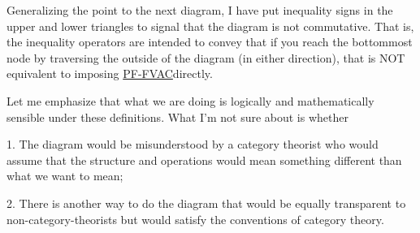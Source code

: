 \documentclass[\econtexRoot/BufferStockTheory]{subfiles}
\newcommand{\BSTlinkTo}{https://\owner.github.io/BufferStockTheory}
\renewcommand{\PFFVAC}{\href{{\BSTlinkTo}\#PFFVAC}{\textrm{PF-FVAC}}}
\begin{document}
\begin{CDCPrivate}
Generalizing the point to the next diagram, I have put inequality signs in the upper and lower triangles to signal that the diagram is not commutative. That is, the inequality operators are intended to convey that if you reach the bottommost node by traversing the outside of the diagram (in either direction), that is NOT equivalent to imposing \PFFVAC directly.

Let me emphasize that what we are doing is logically and mathematically sensible under these definitions.  What I'm not sure about is whether

1. The diagram would be misunderstood by a category theorist who would assume that the structure and operations would mean something different than what we want to mean;

2. There is another way to do the diagram that would be equally transparent to non-category-theorists but would satisfy the conventions of category theory.
\end{CDCPrivate}

\onlyinsubfile{}
\end{document}
